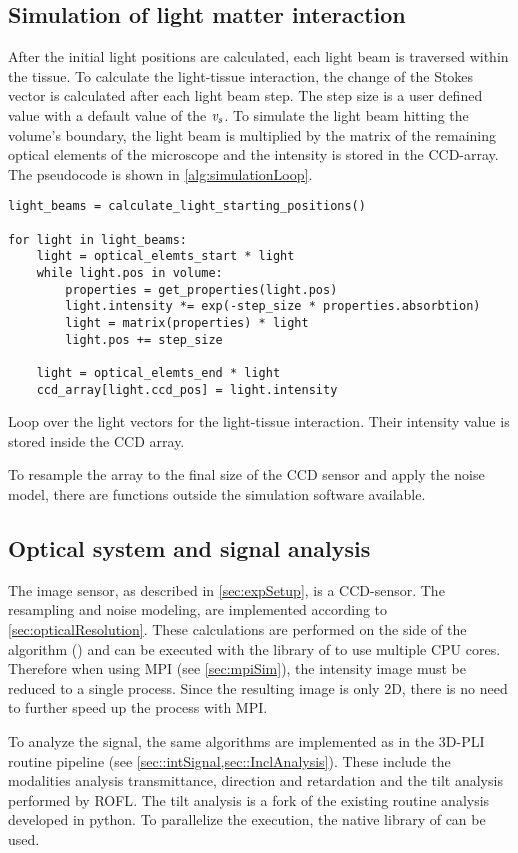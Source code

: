 \subsection{Simulation of light matter interaction}\label{sec:simLightTissue}
%
After the initial light positions are calculated, each light beam is traversed within the tissue.
To calculate the light-tissue interaction, the change of the Stokes vector is calculated after each light beam step.
The step size is a user defined value with a default value of the \Voxelsize{} $\textnormal{$\mathit{v_{s}}$}$.
To simulate the light beam hitting the volume's boundary, the light beam is multiplied by the matrix of the remaining optical elements of the microscope and the intensity is stored in the \ac{CCD}-array.
The pseudocode is shown in \cref{alg:simulationLoop}.
%
\begin{lstfloat}[!tb]
\lstset{style=python}
\begin{lstlisting}[]
light_beams = calculate_light_starting_positions()

for light in light_beams:
    light = optical_elemts_start * light
    while light.pos in volume:
        properties = get_properties(light.pos)
        light.intensity *= exp(-step_size * properties.absorbtion)
        light = matrix(properties) * light
        light.pos += step_size
   
    light = optical_elemts_end * light
    ccd_array[light.ccd_pos] = light.intensity
\end{lstlisting}
\caption{Loop over the light vectors for the light-tissue interaction. Their intensity value is stored inside the \ac{CCD} array.}
\label{alg:simulationLoop}
\end{lstfloat}
%
To resample the array to the final size of the \ac{CCD} sensor and apply the noise model, there are \python{} functions outside the simulation software available.
% 
% 
%
\subsection{Optical system and signal analysis}
\label{sec:ccdOptic}
%
The image sensor, as described in \cref{sec:expSetup}, is a \ac{CCD}-sensor.
The resampling and noise modeling, are implemented according to \cref{sec:opticalResolution}.
These calculations are performed on the \python{} side of the algorithm () and can be executed with the  library of \python{} to use multiple \ac{CPU} cores.
Therefore when using \ac{MPI} (see \cref{sec:mpiSim}), the intensity image must be reduced to a single process.
Since the resulting image is only 2D, there is no need to further speed up the process with \ac{MPI}.
\par
%
To analyze the signal, the same algorithms are implemented as in the \ac{3D-PLI} routine pipeline (see \cref{sec::intSignal,sec::InclAnalysis}).
These include the modalities analysis transmittance, direction and retardation and the tilt analysis performed by \ac{ROFL}.
The tilt analysis is a fork of the existing routine analysis developed in python.
To parallelize the execution, the native  library of \python{} can be used.
% 
% 
%
